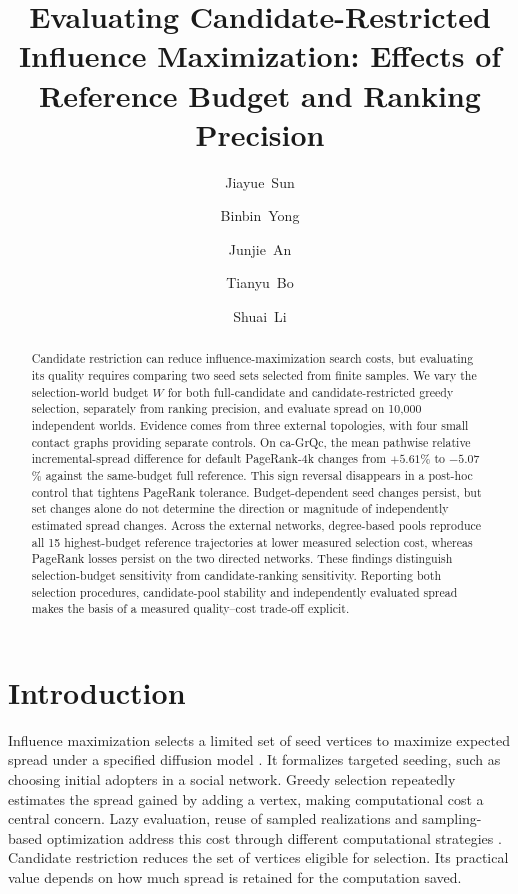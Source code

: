 \documentclass[smallextended]{svjour3}
\begin{document}
\title{Evaluating Candidate-Restricted Influence Maximization: Effects of Reference Budget and Ranking Precision}
\author{\mbox{Jiayue Sun} \and \mbox{Binbin Yong} \and \mbox{Junjie An} \and \mbox{Tianyu Bo} \and \mbox{Shuai Li}}
\date{}
\maketitle
\begin{abstract}
Candidate restriction can reduce influence-maximization search costs, but evaluating its quality requires comparing two seed sets selected from finite samples. We vary the selection-world budget $W$ for both full-candidate and candidate-restricted greedy selection, separately from ranking precision, and evaluate spread on 10,000 independent worlds. Evidence comes from three external topologies, with four small contact graphs providing separate controls. On ca-GrQc, the mean pathwise relative incremental-spread difference for default PageRank-4k changes from $+5.61$\% to $-5.07$\% against the same-budget full reference. This sign reversal disappears in a post-hoc control that tightens PageRank tolerance. Budget-dependent seed changes persist, but set changes alone do not determine the direction or magnitude of independently estimated spread changes. Across the external networks, degree-based pools reproduce all 15 highest-budget reference trajectories at lower measured selection cost, whereas PageRank losses persist on the two directed networks. These findings distinguish selection-budget sensitivity from candidate-ranking sensitivity. Reporting both selection procedures, candidate-pool stability and independently evaluated spread makes the basis of a measured quality--cost trade-off explicit.
\end{abstract}

\section{Introduction}
Influence maximization selects a limited set of seed vertices to maximize expected spread under a specified diffusion model \cite{ref1}. It formalizes targeted seeding, such as choosing initial adopters in a social network. Greedy selection repeatedly estimates the spread gained by adding a vertex, making computational cost a central concern. Lazy evaluation, reuse of sampled realizations and sampling-based optimization address this cost through different computational strategies \cite{ref7,ref8,ref2}. Candidate restriction reduces the set of vertices eligible for selection. Its practical value depends on how much spread is retained for the computation saved.
\end{document}
